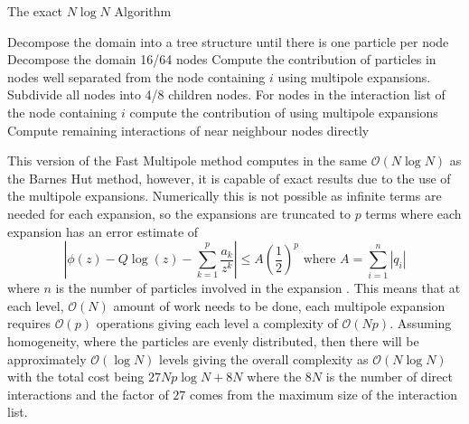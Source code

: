 \begin{algorithm}
\caption{The exact $N \log N$ Algorithm}\label{alg:FMMNlogN}
\begin{algorithmic}
\State Decompose the domain into a tree structure until there is one particle per node
    \State Decompose the domain 16/64 nodes
    \State Compute the contribution of particles in nodes well separated from the node
    \State \; containing $i$ using multipole expansions.
    \Repeat
        \State Subdivide all nodes into 4/8 children nodes.
        \State For nodes in the interaction list of the node containing $i$ compute the 
        \State \; contribution of using multipole expansions
    \State Compute remaining interactions of near neighbour nodes directly
\EndFor
\end{algorithmic}
\end{algorithm}

This version of the Fast Multipole method computes in the same $\mathcal{O}(N\log N)$ as the Barnes Hut method, however, it is capable of exact results due to the use of the multipole expansions. Numerically this is not possible as infinite terms are needed for each expansion, so the expansions are truncated to $p$ terms where each expansion has an error estimate of
\begin{equation*}
    \left|\phi(z)-Q \log (z)-\sum_{k=1}^{p} \frac{a_{k}}{z^{k}}\right| \leq A\left(\frac{1}{2}\right)^{p} \text{ where } A = \sum_{i=1}^{n} |q_i|
\end{equation*}
where $n$ is the number of particles involved in the expansion \cite{Beatson,Greengard1987ASimulations}. This means that at each level, $\mathcal{O}(N)$ amount of work needs to be done, each multipole expansion requires $\mathcal{O}(p)$ operations giving each level a complexity of $\mathcal{O}(Np)$. Assuming homogeneity, where the particles are evenly distributed, then there will be approximately $\mathcal{O}(\log N)$ levels giving the overall complexity as $\mathcal{O}(N\log N)$ with the total cost being $27Np\log N + 8N$ where the $8N$ is the number of direct interactions and the factor of $27$ comes from the maximum size of the interaction list. 

